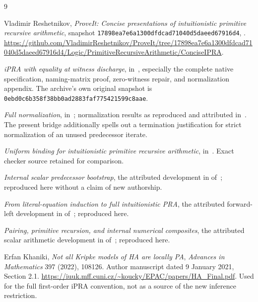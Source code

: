 \documentclass[11pt,a4paper]{article}
\theoremstyle{definition}\newtheorem{definition}[theorem]{Definition}
\theoremstyle{remark}\newtheorem{remark}[theorem]{Remark}
\begin{document}
\begin{thebibliography}{9}

Vladimir Reshetnikov, \emph{ProveIt: Concise presentations of intuitionistic
primitive recursive arithmetic}, snapshot
\texttt{17898ea7e6a1300dfdcad71040d5daeed67916d4},
.
\url{https://github.com/VladimirReshetnikov/ProveIt/tree/17898ea7e6a1300dfdcad71040d5daeed67916d4/Logic/PrimitiveRecursiveArithmetic/ConciseIPRA}.

\emph{iPRA with equality at witness discharge},
in~\cite{baseline}, especially the complete native specification,
naming-matrix proof, zero-witness repair, and normalization appendix.
The archive's own original snapshot is
\texttt{0ebd0c6b358f38bb0ad2883faf775421599c8aae}.

\emph{Full normalization}, 
in~\cite{baseline}; normalization results as reproduced and attributed
in~\cite{witness}. The present bridge additionally spells out a
termination justification for strict normalization of an unused
predecessor iterate.

\emph{Uniform binding for intuitionistic primitive recursive arithmetic},
in~\cite{baseline}. Exact checker source retained for comparison.

\emph{Internal scalar predecessor bootstrap}, the attributed development
in 
of~\cite{baseline}; reproduced here without a claim of new authorship.

\emph{From literal-equation induction to full intuitionistic PRA},
the attributed forward-left development in
of~\cite{baseline}; reproduced here.

\emph{Pairing, primitive recursion, and internal numerical composites},
the attributed scalar arithmetic development in
of~\cite{baseline}; reproduced here.

Erfan Khaniki, \emph{Not all Kripke models of HA are locally PA},
\emph{Advances in Mathematics} 397 (2022), 108126.
Author manuscript dated 9 January 2021, Section 2.1.
\url{https://iuuk.mff.cuni.cz/~koucky/EPAC/papers/HA_Final.pdf}.
Used for the full first-order iPRA convention, not as a source of the
new inference restriction.

\end{thebibliography}
\end{document}
